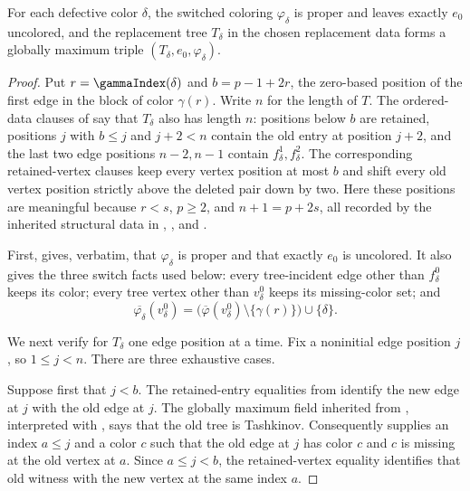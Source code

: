 \begin{lemma}
For each defective color $\delta$, the switched coloring
$\varphi_\delta$ is proper and leaves exactly $e_0$ uncolored, and the
replacement tree $T_\delta$ in the chosen replacement data forms a globally
maximum triple $(T_\delta,e_0,\varphi_\delta)$.
\end{lemma}
\begin{proof}
Put $r=\gammaIndex(\delta)$ and
$b=p-1+2r$, the zero-based position of the first edge in the block of
color $\gamma(r)$.  Write $n$ for the length of $T$.  The ordered-data
clauses of  say that $T_\delta$ also has
length $n$: positions below $b$ are retained, positions $j$ with
$b\leq j$ and $j+2<n$ contain the old entry at position $j+2$, and the
last two edge positions $n-2,n-1$ contain $f^1_\delta,f^2_\delta$.
The corresponding retained-vertex clauses keep every vertex position at
most $b$ and shift every old vertex position strictly above the deleted
pair down by two.  Here these positions are meaningful because
$r<s$, $p\geq2$, and
$n+1=p+2s$, all recorded by the inherited structural data in
, ,
and .

First,  gives, verbatim, that
$\varphi_\delta$ is proper and that exactly $e_0$ is uncolored.  It also
gives the three switch facts used below: every tree-incident edge other
than $f^0_\delta$ keeps its color; every tree vertex other than
$v^0_\delta$ keeps its missing-color set; and
\[
 \overline{\varphi_\delta}(v^0_\delta)
 =\bigl(\overline\varphi(v^0_\delta)
        \setminus\{\gamma(r)\}\bigr)\cup\{\delta\}.
\tag{*}
\]

We next verify  for $T_\delta$ one edge position
at a time.  Fix a noninitial edge position $j$, so $1\leq j<n$.
There are three exhaustive cases.

Suppose first that $j<b$.  The retained-entry equalities from
 identify the new edge at $j$ with the
old edge at $j$.  The globally maximum field inherited from
, interpreted with
, says that the old tree is Tashkinov.
Consequently  supplies an index $a\leq j$ and a
color $c$ such that the old edge at $j$ has color $c$ and $c$ is missing
at the old vertex at $a$.  Since $a\leq j<b$, the retained-vertex equality
identifies that old witness with the new vertex at the same index $a$.


\end{proof}
